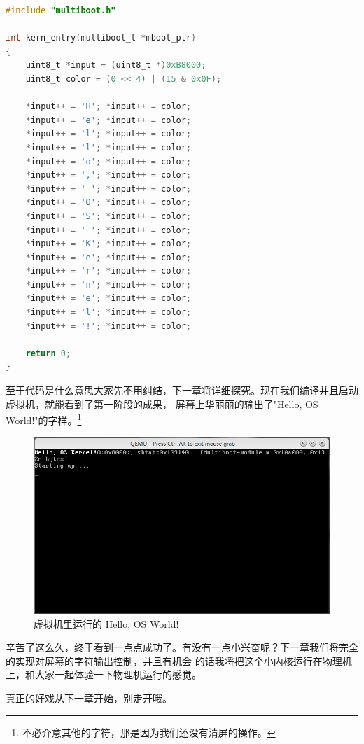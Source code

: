 \begin{lstlisting}[language = C, label = init/entry.c, caption = init/entry.c]
#include "multiboot.h"

int kern_entry(multiboot_t *mboot_ptr)
{
	uint8_t *input = (uint8_t *)0xB8000;
	uint8_t color = (0 << 4) | (15 & 0x0F);

	*input++ = 'H'; *input++ = color;
	*input++ = 'e'; *input++ = color;
	*input++ = 'l'; *input++ = color;
	*input++ = 'l'; *input++ = color;
	*input++ = 'o'; *input++ = color;
	*input++ = ','; *input++ = color;
	*input++ = ' '; *input++ = color;
	*input++ = 'O'; *input++ = color;
	*input++ = 'S'; *input++ = color;
	*input++ = ' '; *input++ = color;
	*input++ = 'K'; *input++ = color;
	*input++ = 'e'; *input++ = color;
	*input++ = 'r'; *input++ = color;
	*input++ = 'n'; *input++ = color;
	*input++ = 'e'; *input++ = color;
	*input++ = 'l'; *input++ = color;
	*input++ = '!'; *input++ = color;

	return 0;
}
\end{lstlisting} 

\par 至于代码是什么意思大家先不用纠结，下一章将详细探究。现在我们编译并且启动虚拟机，就能看到了第一阶段的成果，\allowbreak
屏幕上华丽丽的输出了"Hello, OS World!"的字样。\footnote{不必介意其他的字符，那是因为我们还没有清屏的操作。}

\begin{figure}[ht]
      \centering
      \includegraphics[scale=0.5]{picture/chapt3/hello_os_world.png}
      \caption{虚拟机里运行的 Hello, OS World!}
\end{figure}

\par 辛苦了这么久，终于看到一点点成功了。有没有一点小兴奋呢？下一章我们将完全的实现对屏幕的字符输出控制，并且有机会\allowbreak
的话我将把这个小内核运行在物理机上，和大家一起体验一下物理机运行的感觉。

\par 真正的好戏从下一章开始，别走开哦。

